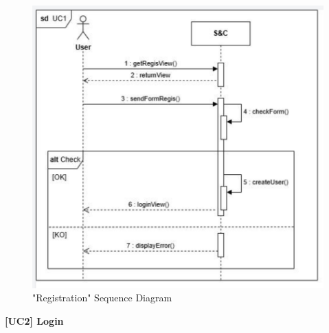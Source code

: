 \documentclass{article}
\begin{document}
\begin{figure}[H]
    \centering
    \includegraphics[width=0.8\linewidth]{sequenceDiagrams/UC1.png}
    \caption{"Registration" Sequence Diagram}
    \label{fig:enter-label}
\end{figure}

\vspace{1cm}
\textbf{[UC2] Login}
\end{document}
